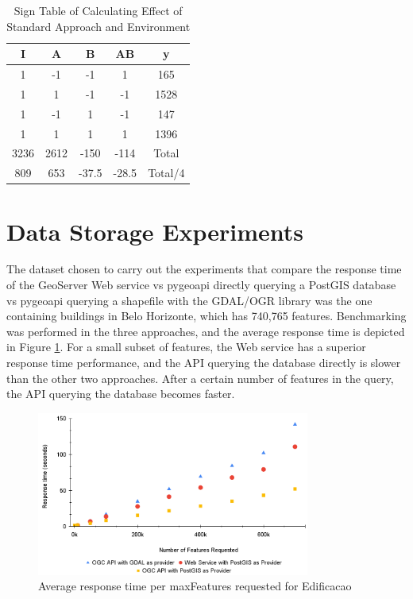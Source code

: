 \begin{table}[H]
\centering
\caption{Sign Table of Calculating Effect of Standard Approach and Environment}
\label{tab:twofactorialdesignLimite}
\begin{tabular}{ccccc}
\hline
I    & A    & B     & AB    & y       \\ \hline
1    & -1   & -1    & 1     & 165     \\
1    & 1    & -1    & -1    & 1528    \\
1    & -1   & 1     & -1    & 147     \\
1    & 1   & 1     & 1    & 1396     \\
3236 & 2612 & -150  & -114  & Total   \\
809  & 653  & -37.5 & -28.5 & Total/4 \\ \hline
\end{tabular}
\end{table}

\section{Data Storage Experiments}

The dataset chosen to carry out the experiments that compare the response time of the GeoServer Web service vs pygeoapi directly querying a PostGIS database vs pygeoapi querying a shapefile with the GDAL/OGR library was the one containing buildings in Belo Horizonte, which has 740,765 features. Benchmarking was performed in the three approaches, and the average response time is depicted in Figure \ref{fig:timeperfeature_dispersaoedificacao}. For a small subset of features, the Web service has a superior response time performance, and the API querying the database directly is slower than the other two approaches. After a certain number of features in the query, the API querying the database becomes faster.

\begin{figure}[H]
\centering
\includegraphics[width=0.8\textwidth]{img/dispersaoedificacao.png}
\caption{Average response time per maxFeatures requested for Edificacao}
\label{fig:timeperfeature_dispersaoedificacao}
\end{figure}

